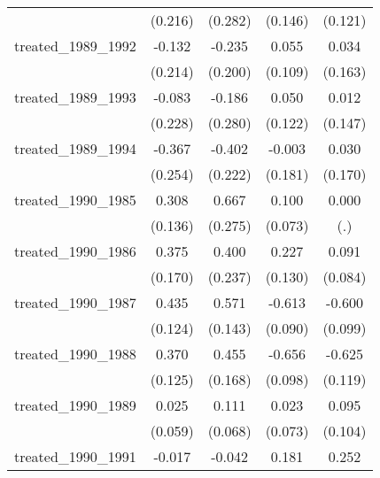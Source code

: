 {\begin{tabular}{l*{4}{c}}
            &     (0.216)         &     (0.282)         &     (0.146)         &     (0.121)         \\
[1em]
treated\_1989\_1992&      -0.132         &      -0.235         &       0.055         &       0.034         \\
            &     (0.214)         &     (0.200)         &     (0.109)         &     (0.163)         \\
[1em]
treated\_1989\_1993&      -0.083         &      -0.186         &       0.050         &       0.012         \\
            &     (0.228)         &     (0.280)         &     (0.122)         &     (0.147)         \\
[1em]
treated\_1989\_1994&      -0.367         &      -0.402         &      -0.003         &       0.030         \\
            &     (0.254)         &     (0.222)         &     (0.181)         &     (0.170)         \\
[1em]
treated\_1990\_1985&       0.308\sym{*}  &       0.667\sym{*}  &       0.100         &       0.000         \\
            &     (0.136)         &     (0.275)         &     (0.073)         &         (.)         \\
[1em]
treated\_1990\_1986&       0.375\sym{*}  &       0.400         &       0.227         &       0.091         \\
            &     (0.170)         &     (0.237)         &     (0.130)         &     (0.084)         \\
[1em]
treated\_1990\_1987&       0.435\sym{***}&       0.571\sym{***}&      -0.613\sym{***}&      -0.600\sym{***}\\
            &     (0.124)         &     (0.143)         &     (0.090)         &     (0.099)         \\
[1em]
treated\_1990\_1988&       0.370\sym{**} &       0.455\sym{**} &      -0.656\sym{***}&      -0.625\sym{***}\\
            &     (0.125)         &     (0.168)         &     (0.098)         &     (0.119)         \\
[1em]
treated\_1990\_1989&       0.025         &       0.111         &       0.023         &       0.095         \\
            &     (0.059)         &     (0.068)         &     (0.073)         &     (0.104)         \\
[1em]
treated\_1990\_1991&      -0.017         &      -0.042         &       0.181         &       0.252         \\

\end{tabular}}
